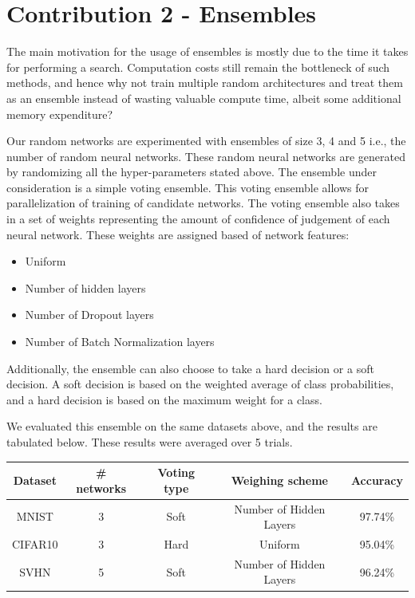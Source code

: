 \documentclass[12pt]{article}
\newcommand{\pbreak}{\vspace{4mm}}
\begin{document}
\section{Contribution 2 - Ensembles}
\begin{flushleft}
The main motivation for the usage of ensembles is mostly due to the time it takes for performing a search. Computation costs still remain the bottleneck of such methods, and hence why not train multiple random architectures and treat them as an ensemble instead of wasting valuable compute time, albeit some additional memory expenditure?
\pbreak

Our random networks are experimented with ensembles of size 3, 4 and 5 i.e., the number of random neural networks. These random neural networks are generated by randomizing all the hyper-parameters stated above. The ensemble under consideration is a simple voting ensemble. This voting ensemble allows for parallelization of training of candidate networks. The voting ensemble also takes in a set of weights representing the amount of confidence of judgement of each neural network. These weights are assigned based of network features:
\begin{itemize}
\item Uniform
\item Number of hidden layers
\item Number of Dropout layers
\item Number of Batch Normalization layers
\end{itemize}

Additionally, the ensemble can also choose to take a hard decision or a soft decision. A soft decision is based on the weighted average of class probabilities, and a hard decision is based on the maximum weight for a class.
\pbreak

We evaluated this ensemble on the same datasets above, and the results are tabulated below. These results were averaged over 5 trials.
\begin{center}
\begin{tabular}{|c|c|c|c|c|}
\hline
\textbf{Dataset} & \textbf{\# networks} & \textbf{Voting type} & \textbf{Weighing scheme} & \textbf{Accuracy} \\
\hline
\hline
MNIST & 3 & Soft & Number of Hidden Layers & 97.74\% \\
\hline
CIFAR10 & 3 & Hard & Uniform & 95.04\% \\
\hline
SVHN & 5 & Soft & Number of Hidden Layers & 96.24\% \\
\hline
\end{tabular}
\end{center}


\end{flushleft}
\end{document}
